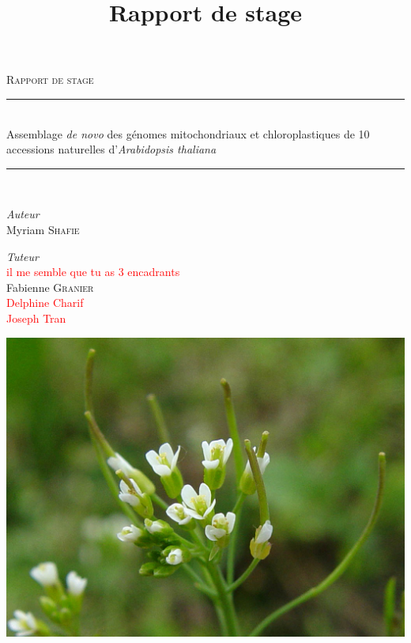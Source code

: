 \documentclass[a4paper]{article}
\title{Rapport de stage}
\newcommand{\mynotes}[1]{\textcolor{red}{#1}}
\newcommand{\HRule}{\rule{\linewidth}{0.5mm}}
\begin{document}
\begin{titlepage}

\begin{center}

\thispagestyle{plain}

{ \Huge \textsc{Rapport de stage}\  \\[0.4cm] }
\HRule \\[0.4cm]
{ \Large Assemblage \textit{de novo} des génomes mitochondriaux et chloroplastiques de 10 accessions naturelles d'\textit{Arabidopsis thaliana}  \\[0.4cm] }
\HRule \\[0.4cm]

\vspace{1.5cm}

\begin{minipage}{0.4\textwidth}
\begin{flushleft} \large
\emph{Auteur}\\
Myriam \textsc{Shafie}
\end{flushleft}
\end{minipage}
\begin{minipage}{0.4\textwidth}
\begin{flushright} \large
	\emph{Tuteur} \\
	\mynotes{il me semble que tu as 3 encadrants} \\
	Fabienne \textsc{Granier} \\
	\mynotes{Delphine Charif} \\
	\mynotes{Joseph Tran}
\end{flushright}
\end{minipage}

\vspace{2cm}

\includegraphics[scale=0.2]{Titre/a_thaliana.jpg}


\end{center}
\end{titlepage}
\end{document}
